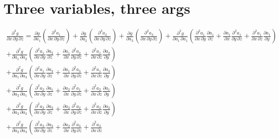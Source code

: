 \documentclass[letter]{article}
\begin{document}
\section{Three variables, three args}
\begin{multline*}
\frac{\partial^3 g}{\partial x\,\partial y\,\partial z} =
\frac{\partial g}{\partial a_1}
\left(
\frac{\partial^3 a_1}{\partial x\,\partial y\,\partial z}
\right)
+
\frac{\partial g}{\partial a_2}
\left(
\frac{\partial^3 a_2}{\partial x\,\partial y\,\partial z}
\right)
+
\frac{\partial g}{\partial a_3}
\left(
\frac{\partial^3 a_3}{\partial x\,\partial y\,\partial z}
\right)
+
\frac{\partial^2 g}{\partial a_1\,\partial a_1}
\left(
\frac{\partial^2 a_1}{\partial x\,\partial y}
\frac{\partial a_1}{\partial z}
+
\frac{\partial a_1}{\partial x}
\frac{\partial^2 a_1}{\partial y\,\partial z}
+
\frac{\partial^2 a_1}{\partial x\,\partial z}
\frac{\partial a_1}{\partial y}
\right)
\\
+
\frac{\partial^2 g}{\partial a_1\,\partial a_2}
\left(
\frac{\partial^2 a_1}{\partial x\,\partial y}
\frac{\partial a_2}{\partial z}
+
\frac{\partial a_1}{\partial x}
\frac{\partial^2 a_2}{\partial y\,\partial z}
+
\frac{\partial^2 a_1}{\partial x\,\partial z}
\frac{\partial a_2}{\partial y}
\right)
\\
+
\frac{\partial^2 g}{\partial a_1\,\partial a_3}
\left(
\frac{\partial^2 a_1}{\partial x\,\partial y}
\frac{\partial a_3}{\partial z}
+
\frac{\partial a_1}{\partial x}
\frac{\partial^2 a_3}{\partial y\,\partial z}
+
\frac{\partial^2 a_1}{\partial x\,\partial z}
\frac{\partial a_3}{\partial y}
\right)
\\
+
\frac{\partial^2 g}{\partial a_2\,\partial a_1}
\left(
\frac{\partial^2 a_2}{\partial x\,\partial y}
\frac{\partial a_1}{\partial z}
+
\frac{\partial a_2}{\partial x}
\frac{\partial^2 a_1}{\partial y\,\partial z}
+
\frac{\partial^2 a_2}{\partial x\,\partial z}
\frac{\partial a_1}{\partial y}
\right)
\\
+
\frac{\partial^2 g}{\partial a_2\,\partial a_2}
\left(
\frac{\partial^2 a_2}{\partial x\,\partial y}
\frac{\partial a_2}{\partial z}
+
\frac{\partial a_2}{\partial x}
\frac{\partial^2 a_2}{\partial y\,\partial z}
+
\frac{\partial^2 a_2}{\partial x\,\partial z}
\frac{\partial a_2}{\partial y}
\right)
\\
+
\frac{\partial^2 g}{\partial a_2\,\partial a_3}
\left(
\frac{\partial^2 a_2}{\partial x\,\partial y}
\frac{\partial a_3}{\partial z}
+
\frac{\partial a_2}{\partial x}
\frac{\partial^2 a_3}{\partial y\,\partial z}
+
\frac{\partial^2 a_2}{\partial x\,\partial z}

\end{multline*}
\end{document}
